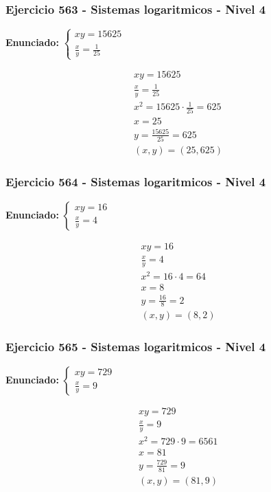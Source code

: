 \documentclass[12pt,a4paper]{article}
\begin{document}
\subsubsection*{Ejercicio 563 - Sistemas logaritmicos - Nivel 4}
\textbf{Enunciado:} \(\begin{cases} xy=15625\\ \frac{x}{y}=\frac{1}{25}\end{cases}\)

\[
\begin{aligned}
xy=15625\\
\frac{x}{y}=\frac{1}{25}\\
x^2=15625\cdot \frac{1}{25}=625\\
x=25\\
y=\frac{15625}{25}=625\\
\boxed{(x,y)=(25,625)}
\end{aligned}
\]


\subsubsection*{Ejercicio 564 - Sistemas logaritmicos - Nivel 4}
\textbf{Enunciado:} \(\begin{cases} xy=16\\ \frac{x}{y}=4\end{cases}\)

\[
\begin{aligned}
xy=16\\
\frac{x}{y}=4\\
x^2=16\cdot 4=64\\
x=8\\
y=\frac{16}{8}=2\\
\boxed{(x,y)=(8,2)}
\end{aligned}
\]


\subsubsection*{Ejercicio 565 - Sistemas logaritmicos - Nivel 4}
\textbf{Enunciado:} \(\begin{cases} xy=729\\ \frac{x}{y}=9\end{cases}\)

\[
\begin{aligned}
xy=729\\
\frac{x}{y}=9\\
x^2=729\cdot 9=6561\\
x=81\\
y=\frac{729}{81}=9\\
\boxed{(x,y)=(81,9)}
\end{aligned}
\]
\end{document}
